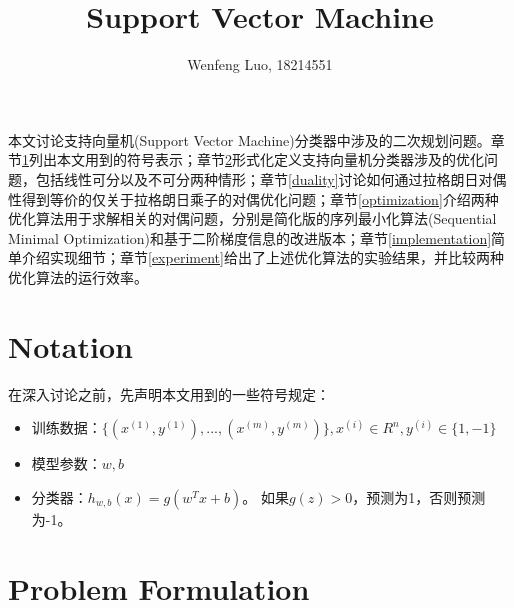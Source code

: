 \documentclass[11pt]{article}
\title{Support Vector Machine}
\author{Wenfeng Luo, 18214551}
\date{}
\begin{document}
\maketitle
本文讨论支持向量机(Support Vector Machine)分类器中涉及的二次规划问题。章节\ref{notation}列出本文用到的符号表示；章节\ref{formulation}形式化定义支持向量机分类器涉及的优化问题，包括线性可分以及不可分两种情形；章节\ref{duality}讨论如何通过拉格朗日对偶性得到等价的仅关于拉格朗日乘子的对偶优化问题；章节\ref{optimization}介绍两种优化算法用于求解相关的对偶问题，分别是简化版的序列最小化算法(Sequential Minimal Optimization)和基于二阶梯度信息的改进版本；章节\ref{implementation}简单介绍实现细节；章节\ref{experiment}给出了上述优化算法的实验结果，并比较两种优化算法的运行效率。
\section{Notation}\label{notation}
在深入讨论之前，先声明本文用到的一些符号规定：
\begin{itemize}
\item 训练数据：$\{(x^{(1)}, y^{(1)}), ..., (x^{(m)}, y^{(m)})\}, x^{(i)}\in R^n, y^{(i)}\in\{1, -1\}$
\item 模型参数：$w, b$
\item 分类器：$h_{w, b}(x)=g(w^Tx+b)$。 如果$g(z) > 0$，预测为1，否则预测为-1。
\end{itemize}

\section{Problem Formulation}\label{formulation}
\end{document}
